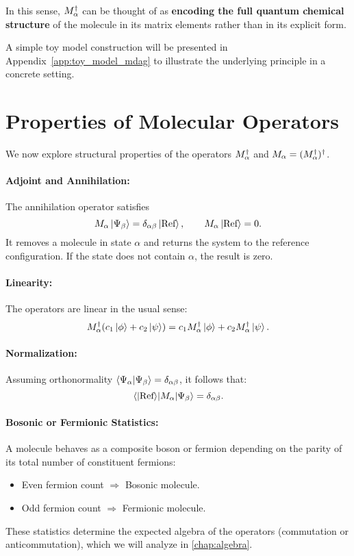 In this sense, \(M^\dagger_{\alpha}\) can be thought of as \textbf{encoding the full quantum chemical structure} of the molecule in its matrix elements rather than in its explicit form.

A simple toy model construction will be presented in Appendix~\ref{app:toy_model_mdag} to illustrate the underlying principle in a concrete setting.

\section{Properties of Molecular Operators}
\label{sec:mol_ops_properties}

We now explore structural properties of the operators \(M^\dagger_{\alpha}\) and \(M_{\alpha} = (M^\dagger_{\alpha})^\dagger\).

\paragraph{Adjoint and Annihilation:} The annihilation operator satisfies
\begin{equation}
	M_{\alpha} \ket{\Psi_\beta} = \delta_{\alpha\beta} \ket{\text{Ref}},
	\qquad
	M_{\alpha} \ket{\text{Ref}} = 0.
	\label{eq:mol_annihilation}
\end{equation}
It removes a molecule in state \(\alpha\) and returns the system to the reference configuration. If the state does not contain \(\alpha\), the result is zero.

\paragraph{Linearity:} The operators are linear in the usual sense:
\[
M^\dagger_{\alpha}(c_1 \ket{\phi} + c_2 \ket{\psi}) = 
 c_1 M^\dagger_{\alpha} \ket{\phi} + c_2 M^\dagger_{\alpha} \ket{\psi}.
\]

\paragraph{Normalization:} Assuming orthonormality \(\braket{\Psi_\alpha}{\Psi_\beta} = \delta_{\alpha\beta}\), it follows that:
\[
\mel{\ket{\text{Ref}}}{M_{\alpha}}{\Psi_\beta} = \delta_{\alpha\beta}.
\]

\paragraph{Bosonic or Fermionic Statistics:} A molecule behaves as a composite boson or fermion depending on the parity of its total number of constituent fermions:
\begin{itemize}
	\item Even fermion count \(\Rightarrow\) Bosonic molecule.
	\item Odd fermion count \(\Rightarrow\) Fermionic molecule.
\end{itemize}
These statistics determine the expected algebra of the operators (commutation or anticommutation), which we will analyze in \cref{chap:algebra}.

